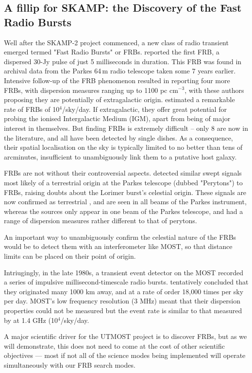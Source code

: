 \subsection{A fillip for SKAMP: the Discovery of the Fast Radio Bursts}

Well after the SKAMP-2 project commenced, a new class of radio transient emerged termed "Fast Radio Bursts" or FRBs. \cite{Lorimer_2007} reported the first FRB, a dispersed 30-Jy pulse of just 5 milliseconds in duration. This FRB was found in archival data from the Parkes 64\,m radio telescope taken some 7 years earlier. Intensive follow-up of the FRB phenomenon resulted in \citep{Thornton_2013} reporting four more FRBs, with dispersion measures ranging up to 1100 pc cm$^{-3}$, with these authors proposing they are potentially of extragalactic origin. \citep{Thornton_2013} estimated a remarkable rate of FRBs of 10$^4$/sky/day. If extragalactic, they offer great potential for probing the ionised Intergalactic Medium (IGM), apart from being of major interest in themselves. But finding FRBs is extremely difficult \cite{Keane_2012} -- only 8 are now in the literature, and all have been detected by single dishes. As a consequence, their spatial localisation on the sky is typically limited to no better than tens of arcminutes, insufficient to unambiguously link them to a putative host galaxy. 

FRBs are not without their controversial aspects. \cite{Burke_Spolaor_2011} detected similar swept signals most likely of a terrestrial origin at the Parkes telescope (dubbed "Perytons") to FRBs, raising doubts about the Lorimer burst's celestial origin. These signals are now confirmed as terrestrial \cite{2015arXiv150402165P}, and are seen in all beams of the Parkes instrument, whereas the \cite{Thornton_2013} sources only appear in one beam of the Parkes telescope, and had a range of dispersion measures rather different to that of perytons.

An important way to unambiguously confirm the celestial nature of the FRBs would be to detect them with an interferometer like MOST, so that distance limits can be placed on their point of origin.

Intriugingly, in the late 1980s, a transient event detector on the MOST recorded a series of impulsive millisecond-timescale radio bursts. \cite{AMY} tentatively concluded that they originated many 1000 km away, and at a rate of order 18,000 times per sky per day. MOST's low frequency resolution (3 MHz) meant that their dispersion properties could not be measured but the event rate is similar to that measured by \citep{Thornton_2013} at 1.4 GHz (10$^4$/sky/day. 

A major scientific driver for the UTMOST project is to discover FRBs, but as we will demonstrate, this does not need to come at the cost of other scientific objectives --- most if not all of the science modes being implemented will operate simultaneously with our FRB search modes.
    